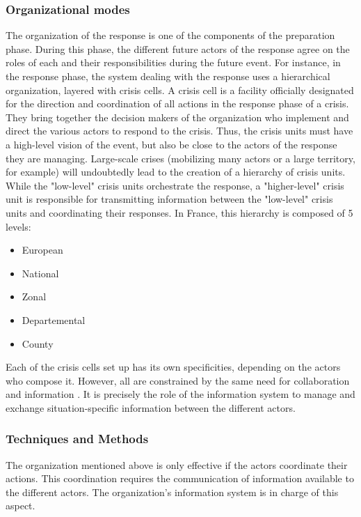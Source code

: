 \subsubsection{Organizational modes}
The organization of the response is one of the components of the preparation phase.
During this phase, the different future actors of the response agree on the roles of each and their responsibilities during the future event.
For instance, in the response phase, the system dealing with the response uses a hierarchical organization, layered with crisis cells.
A crisis cell is a facility officially designated for the direction and coordination of all actions in the response phase of a crisis.
They bring together the decision makers of the organization who implement and direct the various actors to respond to the crisis.
Thus, the crisis units must have a high-level vision of the event, but also be close to the actors of the response they are managing.
Large-scale crises (mobilizing many actors or a large territory, for example) will undoubtedly lead to the creation of a hierarchy of crisis units.
While the "low-level" crisis units orchestrate the response, a "higher-level" crisis unit is responsible for transmitting information between the "low-level" crisis units and coordinating their responses.
In France, this hierarchy is composed of 5 levels:

\begin{itemize}
    \item European
    \item National
    \item Zonal
    \item Departemental
    \item County
\end{itemize}

Each of the crisis cells set up has its own specificities, depending on the actors who compose it.
However, all are constrained by the same need for collaboration \textcite{benabenAIFrameworkMetamodel2020,comfortCrisisManagementHindsight2007} and information \textcite{comfortCrisisManagementHindsight2007,endsleyTheorySituationAwareness1995}.
It is precisely the role of the information system to manage and exchange situation-specific information between the different actors.

\subsubsection{Techniques and Methods}
The organization mentioned above is only effective if the actors coordinate their actions.
This coordination requires the communication of information available to the different actors.
The organization's information system is in charge of this aspect.

